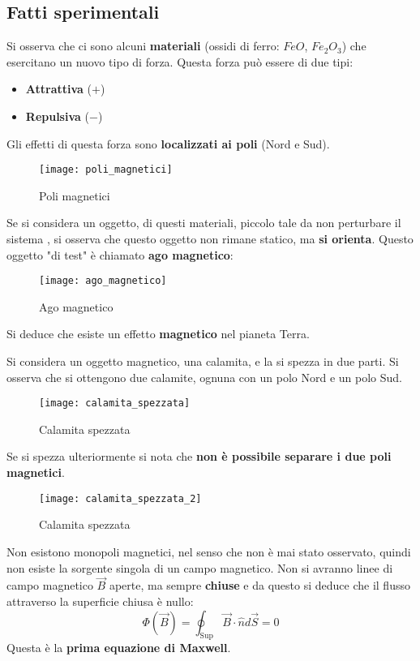 \documentclass[a4paper]{article}
\begin{document}
\subsection{Fatti sperimentali}
Si osserva che ci sono alcuni \textbf{materiali} (ossidi di ferro:
\( FeO \), \( Fe_2O_3 \)) che esercitano un nuovo tipo di forza.
Questa forza può essere di due tipi:
\begin{itemize}
  \item \textbf{Attrattiva} (\( + \))
  \item \textbf{Repulsiva} (\( - \))
\end{itemize}
Gli effetti di questa forza sono \textbf{localizzati ai poli} (Nord e Sud).
\begin{figure}[H]
  \centering
  \texttt{[image: poli\_magnetici]}
  \caption{Poli magnetici}
\end{figure}
\noindent
Se si considera un oggetto, di questi materiali, piccolo tale da non perturbare il sistema ,
si osserva che questo oggetto non rimane statico, ma \textbf{si orienta}. Questo oggetto
"di test" è chiamato \textbf{ago magnetico}:
\begin{figure}[H]
  \centering
  \texttt{[image: ago\_magnetico]}
  \caption{Ago magnetico}
\end{figure}
\noindent
Si deduce che esiste un effetto \textbf{magnetico} nel pianeta Terra.

\begin{example}
  Si considera un oggetto magnetico, una calamita, e la si spezza in due parti. Si
  osserva che si ottengono due calamite, ognuna con un polo Nord e un polo Sud.
  \begin{figure}[H]
    \centering
    \texttt{[image: calamita\_spezzata]}
    \caption{Calamita spezzata}
  \end{figure}
  \noindent
  Se si spezza ulteriormente si nota che \textbf{non è possibile separare i due poli
  magnetici}.
  \begin{figure}[H]
    \centering
    \texttt{[image: calamita\_spezzata\_2]}
    \caption{Calamita spezzata}
  \end{figure}
  \noindent
  Non esistono monopoli magnetici, nel senso che non è mai stato osservato, quindi non
  esiste la sorgente singola di un campo magnetico. Non si avranno linee di campo magnetico
  \( \vec{B} \) aperte, ma sempre \textbf{chiuse} e da questo si deduce che il flusso
  attraverso la superficie chiusa è nullo:
  \[
    \Phi(\vec{B}) = \oint_{\text{Sup}} \vec{B} \cdot \hat{n} d\vec{S} = 0
  \] 
  Questa è la \textbf{prima equazione di Maxwell}.
\end{example}
\end{document}

